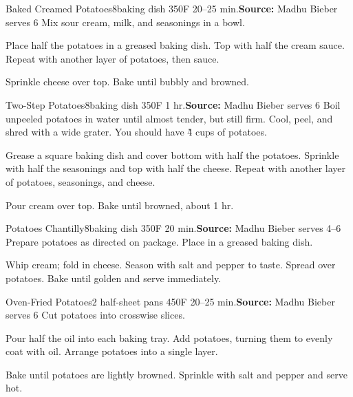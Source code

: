 \begin{recipe}{Baked Creamed Potatoes}{8\inch{}\inch baking dish \hfill 350\0F \hfill 20--25 min.}{\textbf{Source:} Madhu Bieber \hfill serves 6}
 Mix sour cream, milk, and seasonings in a bowl.

 Place half the potatoes in a greased baking dish. Top with half the cream sauce. Repeat with another layer of potatoes, then sauce.

 Sprinkle cheese over top. Bake until bubbly and browned.
\end{recipe}

\begin{recipe}{Two-Step Potatoes}{8\inch{}\inch baking dish \hfill 350\0F \hfill 1 hr.}{\textbf{Source:} Madhu Bieber \hfill serves 6}
 Boil unpeeled potatoes in water until almost tender, but still firm. Cool, peel, and shred with a wide grater. You should have \~4 cups of potatoes.

 Grease a square baking dish and cover bottom with half the potatoes. Sprinkle with half the seasonings and top with half the cheese. Repeat with another layer of potatoes, seasonings, and cheese.

 Pour cream over top. Bake until browned, about 1 hr.
\end{recipe}

\begin{recipe}{Potatoes Chantilly}{8\inch{}\inch baking dish \hfill 350\0F \hfill 20 min.}{\textbf{Source:} Madhu Bieber \hfill serves 4--6}
 Prepare potatoes as directed on package. Place in a greased baking dish.

 Whip cream; fold in cheese. Season with salt and pepper to taste. Spread over potatoes. Bake until golden and serve immediately.
\end{recipe}

\begin{recipe}{Oven-Fried Potatoes}{2 half-sheet pans \hfill 450\0F \hfill 20--25 min.}{\textbf{Source:} Madhu Bieber \hfill serves 6}
 Cut potatoes into \inch crosswise slices.

 Pour half the oil into each baking tray. Add potatoes, turning them to evenly coat with oil. Arrange potatoes into a single layer.

 \newstep Bake until potatoes are lightly browned. Sprinkle with salt and pepper and serve hot.
\end{recipe}


